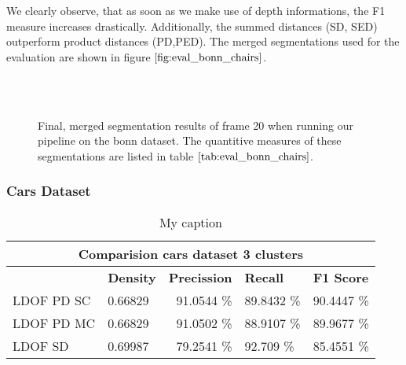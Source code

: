 We clearly observe, that as soon as we make use of depth informations, the F1 measure increases drastically. Additionally, the summed distances (SD, SED) outperform product distances (PD,PED). The merged segmentations used for the evaluation are shown in figure $\ref{fig:eval_bonn_chairs}$. \\ \\
\begin{figure}[H]
\begin{center}
~
~
\end{center}
\caption[Merged Segments Bonn Chairs]{Final, merged segmentation results of frame 20 when running our pipeline on the bonn dataset. The quantitive measures of these segmentations are listed in table $\ref{tab:eval_bonn_chairs}$.}
\label{fig:eval_bonn_chairs}
\end{figure}


\subsubsection{Cars Dataset}


\begin{table}[H]
\centering
\begin{tabular}{|l|l|r|l|l|}
\hline
\multicolumn{5}{|c|}{Comparision cars dataset 3 clusters}                        \\ \hline
              & \textbf{Density} & \textbf{Precission} & \textbf{Recall} & \textbf{F1 Score} \\ \hline
LDOF PD SC & 0.66829 & 91.0544 \%   & 89.8432 \%     & 90.4447 \%  \\ \hline
LDOF PD MC & 0.66829 & 91.0502 \%   & 88.9107 \%     & 89.9677 \%  \\ \hline              
LDOF SD & 0.69987 & 79.2541 \%   & 92.709 \%     & 85.4551 \%  \\ \hline
\end{tabular}
\caption[Cars Dataset]{My caption}
\label{tab:cars_ldof_quality}
\end{table}

